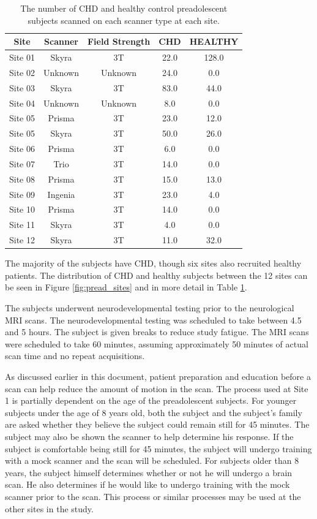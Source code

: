 \begin{table}[t!]
\centering
\caption{The number of CHD and healthy control preadolescent subjects scanned on each scanner type at each site.}
\label{tab:pread-site-counts}
\begin{tabular}{|c|c|c|c|c|}
\hline
\textbf{Site} & \textbf{Scanner} & \textbf{Field Strength} & \textbf{CHD} & \textbf{HEALTHY} \\ \hline
Site 01 & Skyra   & 3T & 22.0 & 128.0 \\ \hline
Site 02 & Unknown & Unknown & 24.0 & 0.0   \\ \hline
Site 03 & Skyra   & 3T & 83.0 & 44.0  \\ \hline
Site 04 & Unknown & Unknown  & 8.0  & 0.0   \\ \hline
Site 05 & Prisma  & 3T & 23.0 & 12.0  \\ \hline
Site 05 & Skyra   & 3T & 50.0 & 26.0  \\ \hline
Site 06 & Prisma  & 3T & 6.0  & 0.0   \\ \hline
Site 07 & Trio    & 3T & 14.0 & 0.0   \\ \hline
Site 08 & Prisma  & 3T & 15.0 & 13.0  \\ \hline
Site 09 & Ingenia & 3T & 23.0 & 4.0   \\ \hline
Site 10 & Prisma  & 3T & 14.0 & 0.0   \\ \hline
Site 11 & Skyra   & 3T & 4.0  & 0.0   \\ \hline
Site 12 & Skyra   & 3T & 11.0 & 32.0  \\ \hline
\end{tabular}
\end{table}

The majority of the subjects have CHD, though six sites also recruited healthy patients. The distribution of CHD and healthy subjects between the 12 sites can be seen in Figure \ref{fig:pread_sites} and in more detail in Table \ref{tab:pread-site-counts}.

The subjects underwent neurodevelopmental testing prior to the neurological MRI scans. The neurodevelopmental testing was scheduled to take between 4.5 and 5 hours. The subject is given breaks to reduce study fatigue. The MRI scans were scheduled to take 60 minutes, assuming approximately 50 minutes of actual scan time and no repeat acquisitions. 

As discussed earlier in this document, patient preparation and education before a scan can help reduce the amount of motion in the scan. The process used at Site 1 is partially dependent on the age of the preadolescent subjects. For younger subjects under the age of 8 years old, both the subject and the subject's family are asked whether they believe the subject could remain still for 45 minutes. The subject may also be shown the scanner to help determine his response. If the subject is comfortable being still for 45 minutes, the subject will undergo training with a mock scanner and the scan will be scheduled. For subjects older than 8 years, the subject himself determines whether or not he will undergo a brain scan. He also determines if he would like to undergo training with the mock scanner prior to the scan. This process or similar processes may be used at the other sites in the study.

